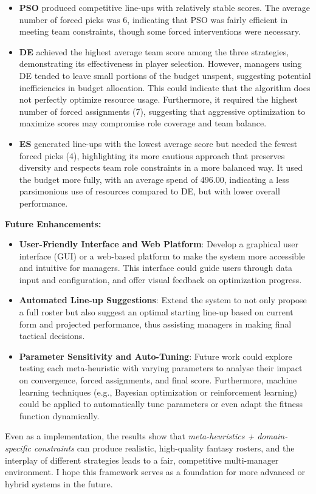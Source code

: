 \documentclass[sigconf]{acmart}
\begin{document}
\begin{itemize}
	\item \textbf{PSO} produced competitive line-ups with relatively stable scores. The average number of forced picks was 6, indicating that PSO was fairly efficient in meeting team constraints, though some forced interventions were necessary.
	\item \textbf{DE} achieved the highest average team score among the three strategies, demonstrating its effectiveness in player selection. However, managers using DE tended to leave small portions of the budget unspent, suggesting potential inefficiencies in budget allocation. This could indicate that the algorithm does not perfectly optimize resource usage. Furthermore, it required the highest number of forced assignments (7), suggesting that aggressive optimization to maximize scores may compromise role coverage and team balance.
	\item \textbf{ES} generated line-ups with the lowest average score but needed the fewest forced picks (4), highlighting its more cautious approach that preserves diversity and respects team role constraints in a more balanced way. It used the budget more fully, with an average spend of 496.00, indicating a less parsimonious use of resources compared to DE, but with lower overall performance.
\end{itemize}


\textbf{Future Enhancements:}
\begin{itemize}
	\item \textbf{User-Friendly Interface and Web Platform}: Develop a graphical user interface (GUI) or a web-based platform to make the system more accessible and intuitive for managers. This interface could guide users through data input and configuration, and offer visual feedback on optimization progress.
	\item \textbf{Automated Line-up Suggestions}: Extend the system to not only propose a full roster but also suggest an optimal starting line-up based on current form and projected performance, thus assisting managers in making final tactical decisions.
	\item \textbf{Parameter Sensitivity and Auto-Tuning}: Future work could explore testing each meta-heuristic with varying parameters to analyse their impact on convergence, forced assignments, and final score. Furthermore, machine learning techniques (e.g., Bayesian optimization or reinforcement learning) could be applied to automatically tune parameters or even adapt the fitness function dynamically.
	
\end{itemize}

Even as a implementation, the results show that \emph{meta-heuristics + domain-specific constraints} can produce realistic, high-quality fantasy rosters, and the interplay of different strategies leads to a fair, competitive multi-manager environment. I hope this framework serves as a foundation for more advanced or hybrid systems in the future.

	
\end{document}
